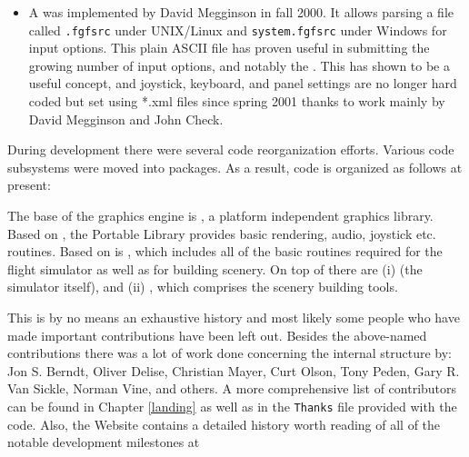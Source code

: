 \begin{itemize}
using the mouse. Alternatively, you can use a hat switch for this purpose, today.
\item A  was implemented by David Megginson in
fall 2000. It allows parsing a file called \texttt{.fgfsrc} under
UNIX/Linux and \texttt{system.fgfsrc} under Windows for input
options. This plain ASCII file has proven useful in submitting the growing number of
input options, and notably the . This has shown to be a useful
concept, and joystick, keyboard, and panel settings are no longer hard coded but set
using *.xml files since spring 2001 thanks to work mainly by David Megginson and John
Check.
\end{itemize}

During development there were several code reorganization efforts. Various code
subsystems were moved into packages. As a result, code is organized as follows at present:
\medskip

The base of the graphics engine is \textbf{}, a platform independent
graphics library. Based on , the Portable Library \PLIB{}
provides basic rendering, audio, joystick etc. routines. Based on \PLIB{} is
\SimGear{}, which includes all of the basic routines required for the
flight simulator as well as for building scenery. On top of \SimGear{}
there are (i) \FlightGear{} (the simulator itself), and (ii)
\TerraGear{}, which comprises the scenery building tools.

This is by no means an exhaustive history and most likely some people who have made
important contributions have been left out. Besides the above-named contributions there
was a lot of work done concerning the internal structure by: Jon S. Berndt, Oliver Delise,  Christian Mayer, 
Curt Olson, Tony Peden,  Gary R. Van
Sickle, Norman Vine, and others. A more
comprehensive list of contributors can be found in Chapter \ref{landing} as well as in
the \texttt{Thanks} file provided with the code. Also, the \FlightGear{}
Website contains a detailed history worth reading of all of the
notable development milestones at
 \medskip

